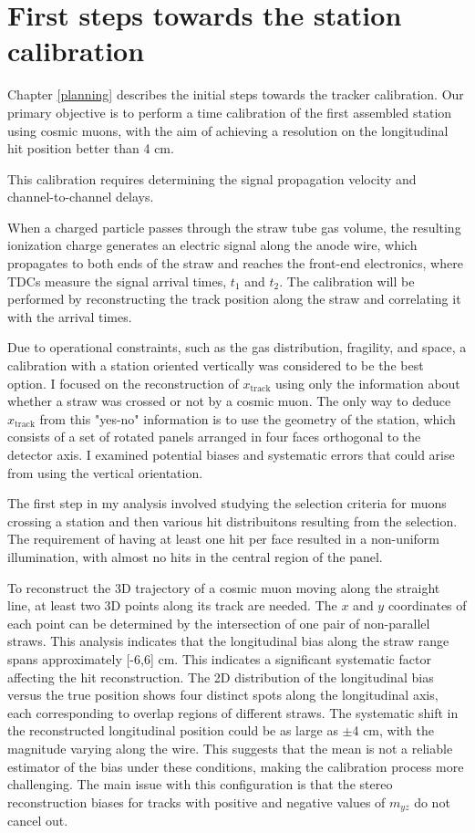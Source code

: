 \section{First steps towards the station calibration}
Chapter \ref{planning} describes the initial steps towards 
the tracker calibration. Our primary objective is to perform a time calibration of 
the first assembled station using cosmic muons, with the aim of achieving 
a resolution on the longitudinal hit position better than 4 cm. 

This calibration requires determining the signal propagation velocity and 
channel-to-channel delays. 

When a charged particle passes through the straw tube gas volume, the 
resulting ionization charge generates an electric signal along the anode wire, 
which propagates to both ends of the straw and reaches the front-end 
electronics, where TDCs measure the signal arrival times, $t_1$ and $t_2$. 
The calibration will be performed by reconstructing the track position 
along the straw and correlating it with the arrival times. 

Due to operational constraints, such as the gas distribution, fragility, 
and space, a calibration with a station oriented vertically was considered
to be the best option. 
I focused on the reconstruction of $x_{\text{track}}$ using only the 
information about whether a straw was crossed or not by a cosmic muon. The only 
way to deduce $x_{\text{track}}$ from this "yes-no" information is to use the geometry of the station, 
which consists of a set of rotated panels arranged in four faces orthogonal 
to the detector axis. I examined potential 
biases and systematic errors that could arise from using the vertical orientation. 

The first step in my analysis involved studying the selection criteria for 
muons crossing a station and then various hit distribuitons 
resulting from the selection. 
The requirement of having at least one hit per face resulted in 
a non-uniform illumination, with almost no hits 
in the central region of the panel. 

To reconstruct the 3D trajectory of a cosmic muon
moving along the straight line, at least 
two 3D points along its track are needed. The $x$ and $y$ coordinates 
of each point can be determined by the intersection of one pair of 
non-parallel straws. This analysis indicates that the longitudinal bias along the straw 
range spans approximately [-6,6] cm. This indicates a significant systematic factor 
affecting the hit reconstruction. 
The 2D distribution of the longitudinal bias versus the 
true position shows four distinct spots along the longitudinal axis, each corresponding 
to overlap regions of different straws. 
The systematic shift in the reconstructed longitudinal position could be as large as $\pm$4 cm, 
with the magnitude varying along the wire. 
This suggests that the mean is not a reliable estimator of the bias under 
these conditions, making the calibration process more challenging.
The main issue with this configuration is that the stereo 
reconstruction biases for tracks with positive and negative values of $m_{yz}$
do not cancel out. 


